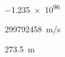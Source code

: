 \documentclass{article}
\begin{document}
    \num{-1.235e96}

    \SI{299792458}{m/s}

    \SI{2 7 3.5}{m}
\end{document}

